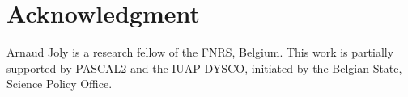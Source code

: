 \documentclass{acm_proc_article-sp}
\begin{document}
\section{Acknowledgment} %
Arnaud Joly is a research fellow of the FNRS, Belgium. This work is
partially supported by PASCAL2 and the IUAP DYSCO, initiated by the
Belgian State, Science Policy Office.

%

%
%
\balancecolumns
\end{document}

